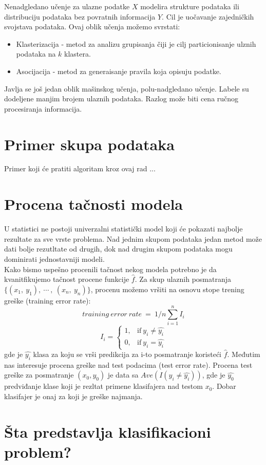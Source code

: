 Nenadgledano učenje za ulazne podatke $X$ modelira strukture podataka ili
distribuciju podataka bez povratnih informacija $Y$. Cil je
uočavanje zajedničkih svojstava podataka. Ovaj oblik učenja možemo svrstati:
\begin{itemize}
  \item Klasterizacija - metod za analizu grupisanja čiji je cilj
  particionisanje ulznih podataka na $k$ klastera.
  \item Asocijacija - metod za generaisanje pravila koja opisuju podatke.
\end{itemize}

Javlja se još jedan oblik mašinskog učenja, polu-nadgledano učenje. Labele su
dodeljene manjim brojem ulaznih podataka. Razlog može biti cena ručnog
procesiranja informacija.

\section{Primer skupa podataka}

Primer koji će pratiti algoritam kroz ovaj rad ...

\section{Procena tačnosti modela}

U statistici ne postoji univerzalni statistički model koji će pokazati najbolje
rezultate za sve vrste problema. Nad jednim skupom podataka jedan metod može
dati bolje rezutltate od drugih, dok nad drugim skupom podataka mogu dominirati
jednostavniji modeli. \\

Kako bismo uspešno procenili tačnost nekog modela potrebno je da kvanitfikujemo
tačnost procene funkcije $\hat{f}$. Za skup ulaznih posmatranja
$\{\left(x_1, \ y_1\right), \ \cdots \ , \ \left(x_n, \ y_n\right)\}$, procenu
možemo vršiti na osnovu stope trening greške (training error rate):
\begin{equation}\label{eq:training_error_rate}
  training \ error \ rate \ = \ 1/n \sum_{i=1}^{n} I_i
\end{equation}
\begin{equation}
  I_i=
    \begin{cases}
      1, & \text{if}\ y_i \neq \hat{y_i} \\
      0, & \text{if}\ y_i = \hat{y_i}
    \end{cases}
\end{equation}
gde je $\hat{y_i}$ klasa za koju se vrši predikcija za i-to posmatranje
koristeći $\hat{f}$. Međutim nas interesuje procena greške nad test podacima
(test error rate). Procena test greške za posmatranje $\left(x_0, y_0\right)$
je data sa $Ave\left(I\left(y_i \neq \hat{y_i}\right)\right)$, gde je $\hat{y_0}$
predviđanje klase koji je rezltat primene klasifajera nad testom $x_0$.
Dobar klasifajer je onaj za koji je greške najmanja.

\section{Šta predstavlja klasifikacioni problem?}

